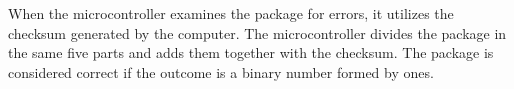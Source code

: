 When the microcontroller examines the package for errors, it utilizes the checksum generated by the computer. The microcontroller divides the package in the same five parts and adds them together with the checksum. The package is considered correct if the outcome is a binary number formed by ones.


